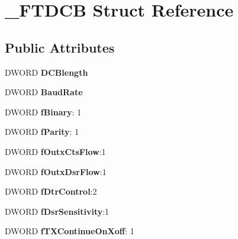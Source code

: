 \hypertarget{struct___f_t_d_c_b}{}\section{\+\_\+\+F\+T\+D\+CB Struct Reference}
\label{struct___f_t_d_c_b}
\subsection*{Public Attributes}
\begin{DoxyCompactItemize}
\item 
\mbox{\label{struct___f_t_d_c_b_a0d577b6cc351abc8313fd7eeaf7a4468}} 
D\+W\+O\+RD {\bfseries D\+C\+Blength}
\item 
\mbox{\label{struct___f_t_d_c_b_a3c59a8bdbb30e28505045b3186c89cbf}} 
D\+W\+O\+RD {\bfseries Baud\+Rate}
\item 
\mbox{\label{struct___f_t_d_c_b_a66a920f15680e8bc01bc4b9d7e1e442a}} 
D\+W\+O\+RD {\bfseries f\+Binary}\+: 1
\item 
\mbox{\label{struct___f_t_d_c_b_a8a81323a9b1ba34bd0cc2ae97d898c73}} 
D\+W\+O\+RD {\bfseries f\+Parity}\+: 1
\item 
\mbox{\label{struct___f_t_d_c_b_a3e5166713d0405820849e27ba554ba7d}} 
D\+W\+O\+RD {\bfseries f\+Outx\+Cts\+Flow}\+:1
\item 
\mbox{\label{struct___f_t_d_c_b_af5ce76c2d358a419e028f8879aca3dcb}} 
D\+W\+O\+RD {\bfseries f\+Outx\+Dsr\+Flow}\+:1
\item 
\mbox{\label{struct___f_t_d_c_b_a770cbe04afe4551d954b460e15bc253e}} 
D\+W\+O\+RD {\bfseries f\+Dtr\+Control}\+:2
\item 
\mbox{\label{struct___f_t_d_c_b_a18de82101e19a3c2be9226489e7df0b2}} 
D\+W\+O\+RD {\bfseries f\+Dsr\+Sensitivity}\+:1
\item 
\mbox{\label{struct___f_t_d_c_b_afa27d3f28cd9154df261cd643df33497}} 
D\+W\+O\+RD {\bfseries f\+T\+X\+Continue\+On\+Xoff}\+: 1

\end{DoxyCompactItemize}
